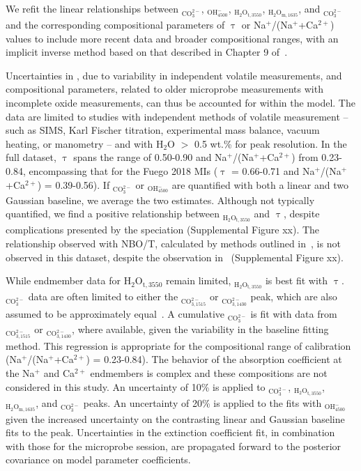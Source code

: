 \documentclass[draft]{agujournal2019}
\begin{document}
We refit the linear relationships between \textepsilon$_{\mathrm{CO_3^{2-}}}$, \textepsilon$_{\mathrm{OH^{-}_{4500}}}$, \textepsilon$_{\mathrm{H_2O_{t, 3550}}}$, \textepsilon$_{\mathrm{H_2O_{m, 1635}}}$, and \textepsilon$_{\mathrm{CO_3^{2-}}}$ and the corresponding compositional parameters of $\uptau$ or Na$^{+}$/(Na$^{+}$+Ca$^{2+}$) values to include more recent data and broader compositional ranges, with an implicit inverse method based on that described in Chapter 9 of~. 


Uncertainties in \textepsilon, due to variability in independent volatile measurements, and compositional parameters, related to older microprobe measurements with incomplete oxide measurements, can thus be accounted for within the model. The \textepsilon data are limited to studies with independent methods of volatile measurement – such as SIMS, Karl Fischer titration, experimental mass balance, vacuum heating, or manometry – and with H$_{2}$O $>$ 0.5 wt.\% for peak resolution. In the full dataset, $\uptau$ spans the range of 0.50-0.90 and Na$^{+}$/(Na$^{+}$+Ca$^{2+}$) from 0.23-0.84, encompassing that for the Fuego 2018 MIs ($\uptau$ = 0.66-0.71 and Na$^{+}$/(Na$^{+}$+Ca$^{2+}$) = 0.39-0.56). If \textepsilon$_{\mathrm{CO_3^{2-}}}$ or \textepsilon$_{\mathrm{OH^{-}_{4500}}}$ are quantified with both a linear and two Gaussian baseline, we average the two estimates. Although not typically quantified, we find a positive relationship between \textepsilon$_{\mathrm{H_2O_{t, 3550}}}$ and $\uptau$, despite complications presented by the speciation (Supplemental Figure xx). The relationship observed with NBO/T, calculated by methods outlined in~, is not observed in this dataset, despite the observation in~ (Supplemental Figure xx). 

While endmember data for H$_{2}$O$_{\mathrm{t, 3550}}$ remain limited, \textepsilon$_{\mathrm{H_2O_{t, 3550}}}$ is best fit with $\uptau$. \textepsilon$_{\mathrm{CO_3^{2-}}}$ data are often limited to either the \textepsilon$_{\mathrm{CO_{3, 1515}^{2-}}}$ or \textepsilon$_{\mathrm{CO_{3, 1430}^{2-}}}$ peak, which are also assumed to be approximately equal~\cite{DixonandPan1995}. A cumulative \textepsilon$_{\mathrm{CO_3^{2-}}}$ is fit with data from \textepsilon$_{\mathrm{CO_{3, 1515}^{2-}}}$ or \textepsilon$_{\mathrm{CO_{3, 1430}^{2-}}}$, where available, given the variability in the baseline fitting method. This regression is appropriate for the compositional range of calibration (Na$^{+}$/(Na$^{+}$+Ca$^{2+}$) = 0.23-0.84). The behavior of the absorption coefficient at the Na$^{+}$ and Ca$^{2+}$ endmembers is complex and these compositions are not considered in this study. An uncertainty of 10\% is applied to \textepsilon$_{\mathrm{CO_3^{2-}}}$, \textepsilon$_{\mathrm{H_2O_{t, 3550}}}$, \textepsilon$_{\mathrm{H_2O_{m, 1635}}}$, and \textepsilon$_{\mathrm{CO_3^{2-}}}$ peaks. An uncertainty of 20\% is applied to the fits with \textepsilon$_{\mathrm{OH^{-}_{4500}}}$ given the increased uncertainty on the contrasting linear and Gaussian baseline fits to the peak. Uncertainties in the extinction coefficient fit, in combination with those for the microprobe session, are propagated forward to the posterior covariance on model parameter coefficients. 
\end{document}
